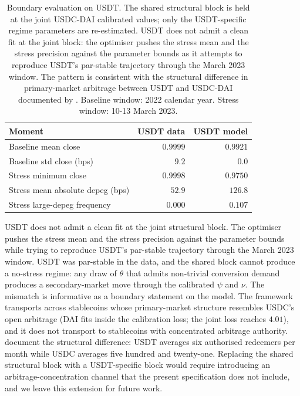 \begin{table}[h]
\centering
\caption{Boundary evaluation on USDT. The shared structural block is held at the joint USDC-DAI calibrated values; only the USDT-specific regime parameters are re-estimated. USDT does not admit a clean fit at the joint block: the optimiser pushes the stress mean and the stress precision against the parameter bounds as it attempts to reproduce USDT's par-stable trajectory through the March 2023 window. The pattern is consistent with the structural difference in primary-market arbitrage between USDT and USDC-DAI documented by \citet{ma_zeng_zhang_2025}. Baseline window: 2022 calendar year. Stress window: 10-13 March 2023.}
\label{tab:usdt_boundary}
\begin{tabular}{lrr}
\toprule
Moment & USDT data & USDT model \\
\midrule
Baseline mean close & $0.9999$ & $0.9921$ \\
Baseline std close (bps) & $9.2$ & $0.0$ \\
Stress minimum close & $0.9998$ & $0.9750$ \\
Stress mean absolute depeg (bps) & $52.9$ & $126.8$ \\
Stress large-depeg frequency & $0.000$ & $0.107$ \\
\bottomrule
\end{tabular}
\end{table}

USDT does not admit a clean fit at the joint structural block. The optimiser pushes the stress mean and the stress precision against the parameter bounds while trying to reproduce USDT's par-stable trajectory through the March 2023 window. USDT was par-stable in the data, and the shared block cannot produce a no-stress regime: any draw of $\theta$ that admits non-trivial conversion demand produces a secondary-market move through the calibrated $\psi$ and $\nu$. The mismatch is informative as a boundary statement on the model. The framework transports across stablecoins whose primary-market structure resembles USDC's open arbitrage (DAI fits inside the calibration loss; the joint loss reaches $4.01$), and it does not transport to stablecoins with concentrated arbitrage authority. \citet{ma_zeng_zhang_2025} document the structural difference: USDT averages six authorised redeemers per month while USDC averages five hundred and twenty-one. Replacing the shared structural block with a USDT-specific block would require introducing an arbitrage-concentration channel that the present specification does not include, and we leave this extension for future work.

